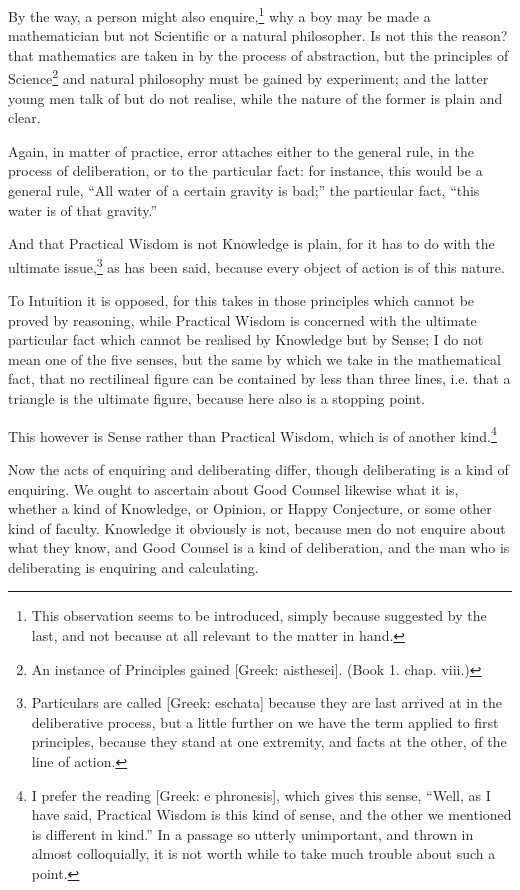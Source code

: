 By the way, a person might also enquire,\footnote{This observation seems to be introduced, simply because suggested by the last,
and not because at all relevant to the matter in hand.}
why a boy may be made a mathematician but not Scientific or a natural
philosopher. Is not this the reason? that mathematics are taken in by the
process of abstraction, but the principles of Science\footnote{An instance of Principles gained [Greek: aisthesei]. (Book 1. chap. viii.)}
and natural philosophy must be gained by experiment; and the latter young men
talk of but do not realise, while the nature of the former is plain and clear.

Again, in matter of practice, error attaches either to the general rule, in the
process of deliberation, or to the particular fact: for instance, this would be
a general rule, “All water of a certain gravity is bad;” the
particular fact, “this water is of that gravity.”

And that Practical Wisdom is not Knowledge is plain, for it has to do with the
ultimate issue,\footnote{Particulars are called [Greek: eschata] because they are last arrived at in the
deliberative process, but a little further on we have the term applied to first
principles, because they stand at one extremity, and facts at the other, of the
line of action.}
as has been said, because every object of action is of this nature.

To Intuition it is opposed, for this takes in those principles which cannot be
proved by reasoning, while Practical Wisdom is concerned with the ultimate
particular fact which cannot be realised by Knowledge but by Sense; I do not
mean one of the five senses, but the same by which we take in the mathematical
fact, that no rectilineal figure can be contained by less than three lines,
i.e. that a triangle is the ultimate figure, because here also is a stopping
point.

This however is Sense rather than Practical Wisdom, which is of another
kind.\footnote{I prefer the reading [Greek: e phronesis], which gives this sense, “Well,
as I have said, Practical Wisdom is this kind of sense, and the other we
mentioned is different in kind.” In a passage so utterly unimportant, and
thrown in almost colloquially, it is not worth while to take much trouble about
such a point.}


Now the acts of enquiring and deliberating differ, though deliberating is a
kind of enquiring. We ought to ascertain about Good Counsel likewise what it
is, whether a kind of Knowledge, or Opinion, or Happy Conjecture, or some other
kind of faculty. Knowledge it obviously is not, because men do not enquire
about what they know, and Good Counsel is a kind of deliberation, and the man
who is deliberating is enquiring and calculating.


